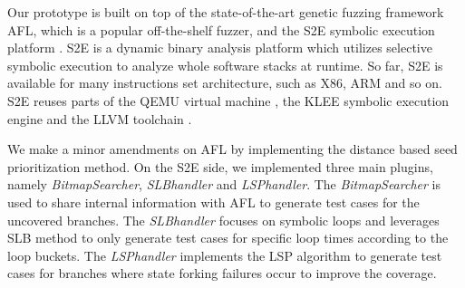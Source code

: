 Our prototype is built on top of the state-of-the-art genetic fuzzing framework AFL, which is a popular off-the-shelf fuzzer, and the S2E symbolic execution platform \cite{chipounov2011s2e}. S2E is a dynamic binary analysis platform which utilizes selective symbolic execution to analyze whole software stacks at runtime. So far, S2E is available for many instructions set architecture, such as X86, ARM and so on. S2E reuses parts of the QEMU virtual machine \cite{bellard2005qemu}, the KLEE symbolic execution engine \cite{cadar2008klee} and the LLVM toolchain \cite{lattner2004llvm}.

We make a minor amendments on AFL by implementing the distance based seed prioritization method. On the S2E side, we implemented three main plugins, namely \textit{BitmapSearcher}, \textit{SLBhandler} and \textit{LSPhandler}. The \textit{BitmapSearcher} is used to share internal information with AFL to generate test cases for the uncovered branches. The \textit{SLBhandler} focuses on symbolic loops and leverages SLB method to only generate test cases for specific loop times according to the loop buckets. The \textit{LSPhandler} implements the LSP algorithm to generate test cases for branches where state forking failures occur to improve the coverage.
